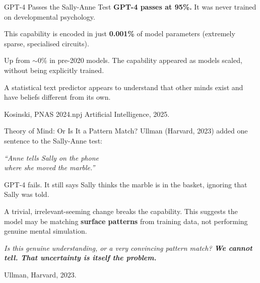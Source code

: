 \documentclass[aspectratio=169, 12pt]{beamer}
\begin{document}
\begin{frame}{GPT-4 Passes the Sally-Anne Test}
  {\small \textbf{GPT-4 passes at 95\%.}
  It was never trained on developmental psychology.}
  \vspace{0.8em}

  {\small This capability is encoded in just \textbf{0.001\%} of model
  parameters (extremely sparse, specialised circuits).}
  \vspace{0.8em}

  {\small Up from ${\sim}$0\% in pre-2020 models. The capability appeared
  as models scaled, without being explicitly trained.}
  \vspace{0.8em}

  {\small A statistical text predictor appears to understand that other
  minds exist and have beliefs different from its own.}
  \vspace{0.5em}

  {\footnotesize Kosinski, PNAS 2024.\quad npj Artificial Intelligence, 2025.}
\end{frame}

\begin{frame}{Theory of Mind: Or Is It a Pattern Match?}
  {\small Ullman (Harvard, 2023) added one sentence to the Sally-Anne test:}
  \vspace{0.5em}

  \begin{center}
    {\normalsize\itshape ``Anne tells Sally on the phone\\
    where she moved the marble.''}
  \end{center}
  \vspace{0.5em}

  {\small \alert{GPT-4 fails.} It still says Sally thinks the marble is in the
  basket, ignoring that Sally was told.}
  \vspace{0.8em}

  {\small A trivial, irrelevant-seeming change breaks the capability.
  This suggests the model may be matching \textbf{surface patterns} from
  training data, not performing genuine mental simulation.}
  \vspace{0.5em}

  {\small\itshape Is this genuine understanding, or a very convincing
  pattern match? \textbf{We cannot tell. That uncertainty is itself
  the problem.}}
  \vspace{0.3em}

  {\footnotesize Ullman, Harvard, 2023.}
\end{frame}
\end{document}

